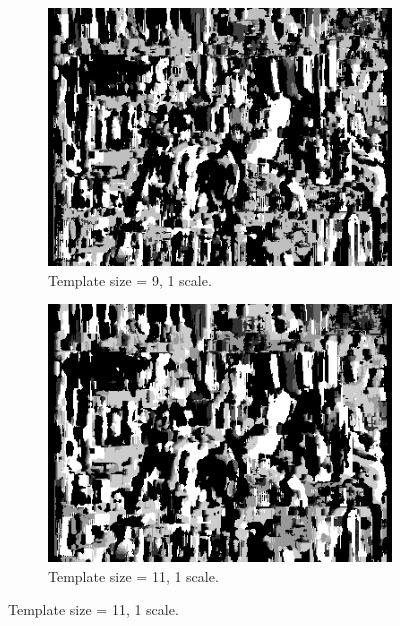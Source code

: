 \documentclass[12pt,a4paper,oneside,final]{article}
\begin{document}
\begin{figure}[H]
\begin{subfigure}[b]{0.24\textwidth}
	\includegraphics[width=\textwidth]{disparity_s1_k9set_1.png}
	\caption{Template size = 9, 1 scale.}
\end{subfigure}
\begin{subfigure}[b]{0.24\textwidth}
	\includegraphics[width=\textwidth]{disparity_s1_k11set_1.png}
	\caption{Template size = 11, 1 scale.}
\end{subfigure}
\end{figure}
\end{document}
